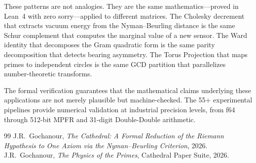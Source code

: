 \documentclass[11pt,a4paper]{article}
\begin{document}
These patterns are not analogies. They are the same
mathematics---proved in Lean~4 with zero sorry---applied to
different matrices. The Cholesky decrement that extracts vacuum
energy from the Nyman--Beurling distance is the same Schur
complement that computes the marginal value of a new sensor.
The Ward identity that decomposes the Gram quadratic form is the
same parity decomposition that detects bearing asymmetry.
The Torus Projection that maps primes to independent circles
is the same GCD partition that parallelizes number-theoretic
transforms.

The formal verification guarantees that the mathematical claims
underlying these applications are not merely plausible but
machine-checked. The 55+ experimental pipelines provide numerical
validation at industrial precision levels, from f64 through
512-bit MPFR and 31-digit Double-Double arithmetic.

\begin{thebibliography}{99}
J.R.~Gochanour, \emph{The Cathedral: A Formal Reduction of the
Riemann Hypothesis to One Axiom via the Nyman--Beurling
Criterion}, 2026.
J.R.~Gochanour, \emph{The Physics of the Primes}, Cathedral Paper
Suite, 2026.
\end{thebibliography}
\end{document}
